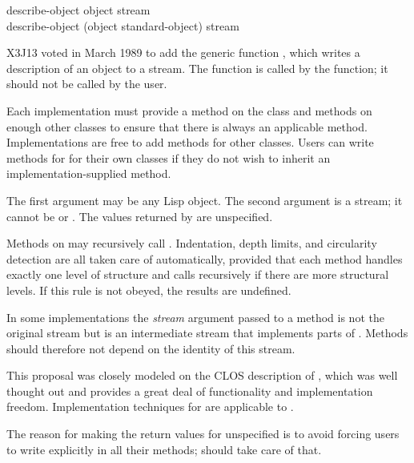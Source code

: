 \begin{newer}
\begin{defun}
describe-object object stream \\
describe-object (object standard-object) stream

X3J13 voted in March 1989  to add
  the generic function , which writes a description of an object to a
  stream.  The function  is called by the  function; it
  should not be called by the user.

  Each implementation must provide a method on the class
   and methods on enough other classes to ensure that
  there is always an applicable method.  Implementations are free to add
  methods for other classes.  Users can write methods for  for
  their own classes if they do not wish to inherit an implementation-supplied
  method.

   The first argument may be any Lisp object.  The second argument is a stream; it
   cannot be  or .
   The values returned by  are unspecified.

   Methods on  may recursively call .  Indentation,
   depth limits, and circularity detection are all taken care of automatically,
   provided that each method handles exactly one level of structure and calls
    recursively if there are more structural levels.
   If this rule is not obeyed, the results are undefined.

   In some implementations the {\it stream} argument passed to a 
   method is not the original stream but is an intermediate stream that
   implements parts of .  Methods should therefore not depend on the
   identity of this stream.

\beforenoterule
\begin{rationale}
 This proposal was closely modeled on the CLOS description of ,
 which was well thought out and provides a great deal of functionality and
 implementation freedom.  Implementation techniques for
  are applicable to .

 The reason for making the return values for  unspecified is to
 avoid forcing users to write  explicitly in all their methods;
  should take care of that.
\end{rationale}
\afternoterule
\end{defun}
\end{newer}


